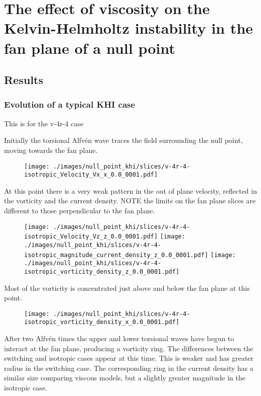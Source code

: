 \chapter{The effect of viscosity on the Kelvin-Helmholtz instability in the fan plane of a null point}

\section{Results}

\subsection{Evolution of a typical KHI case}

This is for the v-4r-4 case

Initially the torsional Alfv\'en wave traces the field surrounding the null point, moving towards the fan plane.

\begin{figure}[H]
  \centering
  \texttt{[image: ./images/null\_point\_khi/slices/v-4r-4-isotropic\_Velocity\_Vx\_x\_0.0\_0001.pdf]}
\end{figure}

At this point there is a very weak pattern in the out of plane velocity, reflected in the vorticity and the current density. NOTE the limits on the fan plane slices are different to those perpendicular to the fan plane.

\begin{figure}[H]
  \centering
  \texttt{[image: ./images/null\_point\_khi/slices/v-4r-4-isotropic\_Velocity\_Vz\_z\_0.0\_0001.pdf]}
  \texttt{[image: ./images/null\_point\_khi/slices/v-4r-4-isotropic\_magnitude\_current\_density\_z\_0.0\_0001.pdf]}
  \texttt{[image: ./images/null\_point\_khi/slices/v-4r-4-isotropic\_vorticity\_density\_z\_0.0\_0001.pdf]}
\end{figure}

Most of the vorticity is concentrated just above and below the fan plane at this point.

\begin{figure}[H]
  \centering
  \texttt{[image: ./images/null\_point\_khi/slices/v-4r-4-isotropic\_vorticity\_density\_x\_0.0\_0001.pdf]}
\end{figure}

After two Alfv\'en times the upper and lower torsional waves have begun to interact at the fan plane, producing a vorticity ring. The differences between the switching and isotropic cases appear at this time. This is weaker and has greater radius in the switching case. The corresponding ring in the current density has a similar size comparing viscous models, but a slightly greater magnitude in the isotropic case.

